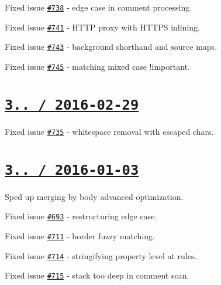 \begin{DoxyItemize}
\item Fixed issue \href{https://github.com/jakubpawlowicz/clean-css/issues/738}{\tt \#738} -\/ edge case in comment processing.
\item Fixed issue \href{https://github.com/jakubpawlowicz/clean-css/issues/741}{\tt \#741} -\/ H\+T\+TP proxy with H\+T\+T\+PS inlining.
\item Fixed issue \href{https://github.com/jakubpawlowicz/clean-css/issues/743}{\tt \#743} -\/ background shorthand and source maps.
\item Fixed issue \href{https://github.com/jakubpawlowicz/clean-css/issues/745}{\tt \#745} -\/ matching mixed case {\ttfamily !important}.
\end{DoxyItemize}

\section*{\href{https://github.com/jakubpawlowicz/clean-css/compare/v3.4.9...v3.4.10}{\tt 3.. / 2016-\/02-\/29} }


\begin{DoxyItemize}
\item Fixed issue \href{https://github.com/jakubpawlowicz/clean-css/issues/735}{\tt \#735} -\/ whitespace removal with escaped chars.
\end{DoxyItemize}

\section*{\href{https://github.com/jakubpawlowicz/clean-css/compare/v3.4.8...v3.4.9}{\tt 3.. / 2016-\/01-\/03} }


\begin{DoxyItemize}
\item Sped up merging by body advanced optimization.
\item Fixed issue \href{https://github.com/jakubpawlowicz/clean-css/issues/693}{\tt \#693} -\/ restructuring edge case.
\item Fixed issue \href{https://github.com/jakubpawlowicz/clean-css/issues/711}{\tt \#711} -\/ border fuzzy matching.
\item Fixed issue \href{https://github.com/jakubpawlowicz/clean-css/issues/714}{\tt \#714} -\/ stringifying property level at rules.
\item Fixed issue \href{https://github.com/jakubpawlowicz/clean-css/issues/715}{\tt \#715} -\/ stack too deep in comment scan.
\end{DoxyItemize}

